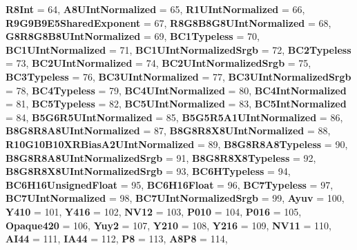 \begin{DoxyCompactItemize}
{\bfseries R8\+Int} = 64, 
{\bfseries A8\+U\+Int\+Normalized} = 65, 
{\bfseries R1\+U\+Int\+Normalized} = 66, 
{\bfseries R9\+G9\+B9\+E5\+Shared\+Exponent} = 67, 
\newline
{\bfseries R8\+G8\+B8\+G8\+U\+Int\+Normalized} = 68, 
{\bfseries G8\+R8\+G8\+B8\+U\+Int\+Normalized} = 69, 
{\bfseries B\+C1\+Typeless} = 70, 
{\bfseries B\+C1\+U\+Int\+Normalized} = 71, 
\newline
{\bfseries B\+C1\+U\+Int\+Normalized\+Srgb} = 72, 
{\bfseries B\+C2\+Typeless} = 73, 
{\bfseries B\+C2\+U\+Int\+Normalized} = 74, 
{\bfseries B\+C2\+U\+Int\+Normalized\+Srgb} = 75, 
\newline
{\bfseries B\+C3\+Typeless} = 76, 
{\bfseries B\+C3\+U\+Int\+Normalized} = 77, 
{\bfseries B\+C3\+U\+Int\+Normalized\+Srgb} = 78, 
{\bfseries B\+C4\+Typeless} = 79, 
\newline
{\bfseries B\+C4\+U\+Int\+Normalized} = 80, 
{\bfseries B\+C4\+Int\+Normalized} = 81, 
{\bfseries B\+C5\+Typeless} = 82, 
{\bfseries B\+C5\+U\+Int\+Normalized} = 83, 
\newline
{\bfseries B\+C5\+Int\+Normalized} = 84, 
{\bfseries B5\+G6\+R5\+U\+Int\+Normalized} = 85, 
{\bfseries B5\+G5\+R5\+A1\+U\+Int\+Normalized} = 86, 
{\bfseries B8\+G8\+R8\+A8\+U\+Int\+Normalized} = 87, 
\newline
{\bfseries B8\+G8\+R8\+X8\+U\+Int\+Normalized} = 88, 
{\bfseries R10\+G10\+B10\+X\+R\+Bias\+A2\+U\+Int\+Normalized} = 89, 
{\bfseries B8\+G8\+R8\+A8\+Typeless} = 90, 
{\bfseries B8\+G8\+R8\+A8\+U\+Int\+Normalized\+Srgb} = 91, 
\newline
{\bfseries B8\+G8\+R8\+X8\+Typeless} = 92, 
{\bfseries B8\+G8\+R8\+X8\+U\+Int\+Normalized\+Srgb} = 93, 
{\bfseries B\+C6\+H\+Typeless} = 94, 
{\bfseries B\+C6\+H16\+Unsigned\+Float} = 95, 
\newline
{\bfseries B\+C6\+H16\+Float} = 96, 
{\bfseries B\+C7\+Typeless} = 97, 
{\bfseries B\+C7\+U\+Int\+Normalized} = 98, 
{\bfseries B\+C7\+U\+Int\+Normalized\+Srgb} = 99, 
\newline
{\bfseries Ayuv} = 100, 
{\bfseries Y410} = 101, 
{\bfseries Y416} = 102, 
{\bfseries N\+V12} = 103, 
\newline
{\bfseries P010} = 104, 
{\bfseries P016} = 105, 
{\bfseries Opaque420} = 106, 
{\bfseries Yuy2} = 107, 
\newline
{\bfseries Y210} = 108, 
{\bfseries Y216} = 109, 
{\bfseries N\+V11} = 110, 
{\bfseries A\+I44} = 111, 
\newline
{\bfseries I\+A44} = 112, 
{\bfseries P8} = 113, 
{\bfseries A8\+P8} = 114, 

\end{DoxyCompactItemize}

